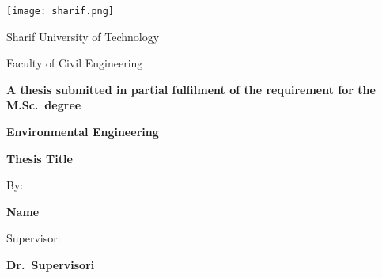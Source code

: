 \begin{titlepage}
\vspace*{1cm}
\begin{center}
\texttt{[image: sharif.png]}

 \large
Sharif University of Technology


Faculty of Civil Engineering

\vspace*{1cm}
\large
\textbf{A thesis submitted in partial fulfilment of the requirement for the M.Sc.~degree}


\textbf{Environmental Engineering}

\vspace*{1.5cm}
\Huge
\textbf{Thesis Title}     
\vspace{1.5cm}

\Large

By:

\textbf{Name}
\vspace{1.5cm}

Supervisor:

\textbf{Dr.~Supervisori}
\vfill
\Large
\latintoday        
\end{center}
\end{titlepage}
